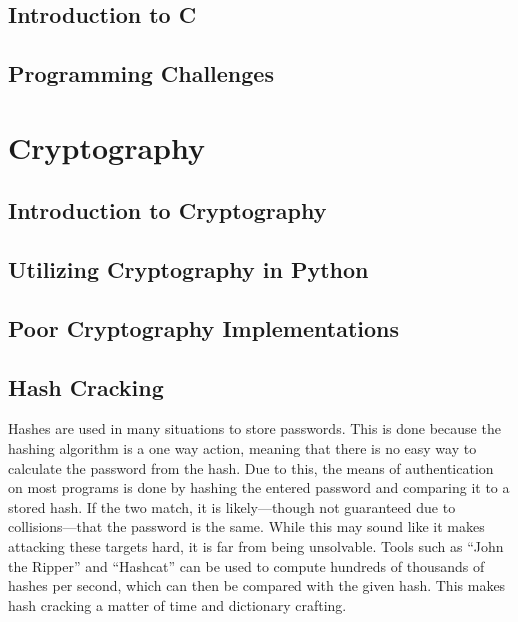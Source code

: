 \documentclass[a4paper,11pt]{report}
\begin{document}
	\section{Introduction to C}
	\section{Programming Challenges}
\chapter{Cryptography}
	\label{ch:Cryptography}
	\section{Introduction to Cryptography}
	\section{Utilizing Cryptography in Python}
	\section{Poor Cryptography Implementations}
	\section{Hash Cracking}
		Hashes are used in many situations to store passwords. 
		This is done because the hashing algorithm is a one way action, meaning that there is no easy way to calculate the password from the hash. 
		Due to this, the means of authentication on most programs is done by hashing the entered password and comparing it to a stored hash. 
		If the two match, it is likely---though not guaranteed due to collisions---that the password is the same. 
		While this may sound like it makes attacking these targets hard, it is far from being unsolvable. 
		Tools such as ``John the Ripper'' and ``Hashcat'' can be used to compute hundreds of thousands of hashes per second, which can then be compared with the given hash. 
		This makes hash cracking a matter of time and dictionary crafting. 
\end{document}
